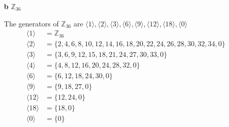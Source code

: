 \documentclass[paper=usletter, fontsize=12pt]{article}
\begin{document}
\begin{itemize}
\begin{itemize}
\begin{enumerate}
\begin{cproof}
                \end{cproof}
                \newpage

                \item[\textbf{b}] $\mathbb{Z}_{36}$
                \begin{cproof}

                    The generators of $\mathbb{Z}_{36}$ are $\langle1\rangle,
                    \langle2\rangle, \langle3\rangle, \langle6\rangle,
                    \langle9\rangle, \langle12\rangle, \langle18\rangle,
                    \langle0\rangle$
                    \begin{align*}
                        \langle1\rangle & = \mathbb{Z}_{36}\\
                        \langle2\rangle & = \{2,4,6,8,10,12,14,16,18,20,22,24,26,28,30,32,34,0\}\\
                        \langle3\rangle & = \{3,6,9,12,15,18,21,24,27,30,33,0\}\\
                        \langle4\rangle & = \{4,8,12,16,20,24,28,32,0\}\\
                        \langle6\rangle & = \{6,12,18,24,30,0\}\\
                        \langle9\rangle & = \{9,18,27,0\}\\
                        \langle12\rangle & = \{12,24,0\}\\
                        \langle18\rangle & = \{18,0\}\\
                        \langle0\rangle & = \{0\}
                    \end{align*}


\end{cproof}
\end{enumerate}
\end{itemize}
\end{itemize}
\end{document}
